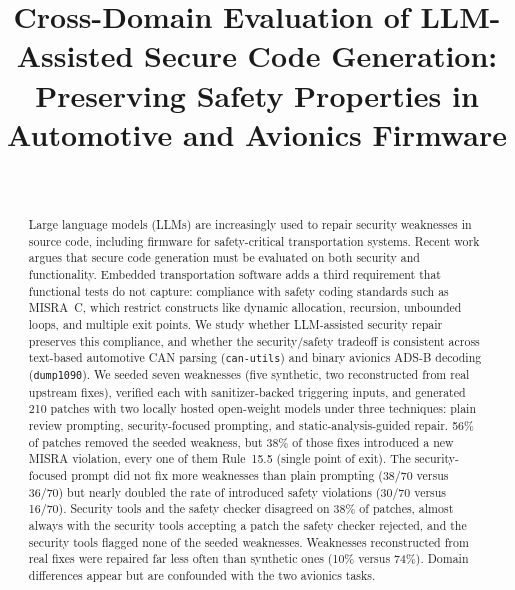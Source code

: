 \documentclass[12pt]{IEEEtran}
\begin{document}
\title{Cross-Domain Evaluation of LLM-Assisted Secure Code Generation: Preserving Safety Properties in Automotive and Avionics Firmware}

\author{
\\
%
}
\maketitle

\begin{abstract}
Large language models (LLMs) are increasingly used to repair security weaknesses in source code, including firmware for safety-critical transportation systems. Recent work argues that secure code generation must be evaluated on both security and functionality. Embedded transportation software adds a third requirement that functional tests do not capture: compliance with safety coding standards such as MISRA~C, which restrict constructs like dynamic allocation, recursion, unbounded loops, and multiple exit points. We study whether LLM-assisted security repair preserves this compliance, and whether the security/safety tradeoff is consistent across text-based automotive CAN parsing (\texttt{can-utils}) and binary avionics ADS-B decoding (\texttt{dump1090}). We seeded seven weaknesses (five synthetic, two reconstructed from real upstream fixes), verified each with sanitizer-backed triggering inputs, and generated 210 patches with two locally hosted open-weight models under three techniques: plain review prompting, security-focused prompting, and static-analysis-guided repair. 56\% of patches removed the seeded weakness, but 38\% of those fixes introduced a new MISRA violation, every one of them Rule~15.5 (single point of exit). The security-focused prompt did not fix more weaknesses than plain prompting (38/70 versus 36/70) but nearly doubled the rate of introduced safety violations (30/70 versus 16/70). Security tools and the safety checker disagreed on 38\% of patches, almost always with the security tools accepting a patch the safety checker rejected, and the security tools flagged none of the seeded weaknesses. Weaknesses reconstructed from real fixes were repaired far less often than synthetic ones (10\% versus 74\%). Domain differences appear but are confounded with the two avionics tasks.
\end{abstract}
\end{document}
